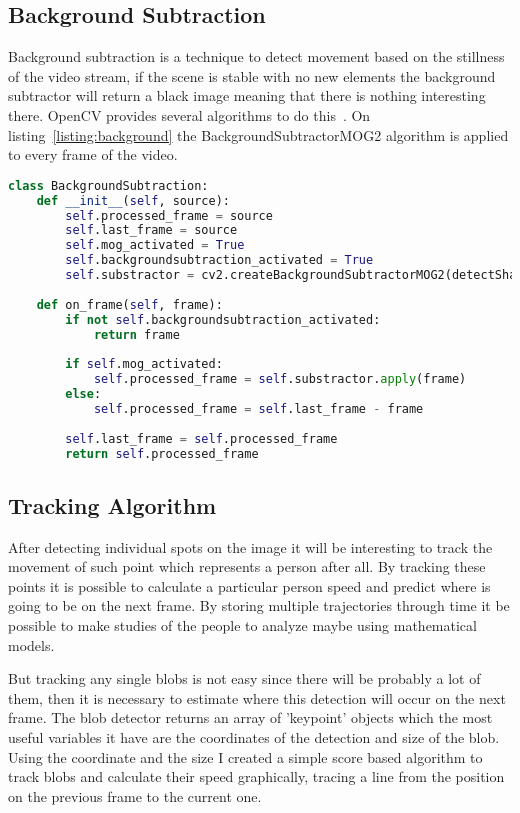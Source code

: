 \documentclass[hidelinks,11pt,a4paper,oneside,article]{memoir}
\begin{document}
\subsection{Background Subtraction}
Background subtraction is a technique to detect movement based on the stillness of the video stream, if the scene is stable with no new elements the background subtractor will return a black image meaning that there is nothing interesting there. OpenCV provides several algorithms to do this~\cite{opencvBackgrounds}. On listing~\ref{listing:background} the BackgroundSubtractorMOG2 algorithm is applied to every frame of the video.
\begin{lstlisting}[label={listing:background},caption={Background Subsration Code},language=Python, style=styleprogramming]
class BackgroundSubtraction:
    def __init__(self, source):
        self.processed_frame = source
        self.last_frame = source
        self.mog_activated = True
        self.backgroundsubtraction_activated = True
        self.substractor = cv2.createBackgroundSubtractorMOG2(detectShadows=False)
    
    def on_frame(self, frame):
        if not self.backgroundsubtraction_activated:
            return frame
        
        if self.mog_activated:
            self.processed_frame = self.substractor.apply(frame)
        else:
            self.processed_frame = self.last_frame - frame
        
        self.last_frame = self.processed_frame
        return self.processed_frame
\end{lstlisting}

\subsection{Tracking Algorithm}\label{sec:tracking}
After detecting individual spots on the image it will be interesting to track the movement of such point which represents a person after all. By tracking these points it is possible to calculate a particular person speed and predict where is going to be on the next frame. By storing multiple trajectories through time it be possible to make studies of the people to analyze maybe using mathematical models.

But tracking any single blobs is not easy since there will be probably a lot of them, then it is necessary to estimate where this detection will occur on the next frame. The blob detector returns an array of 'keypoint' objects which the most useful variables it have are the coordinates of the detection and size of the blob. Using the coordinate and the size I created a simple score based algorithm to track blobs and calculate their speed graphically, tracing a line from the position on the previous frame to the current one.
\end{document}
